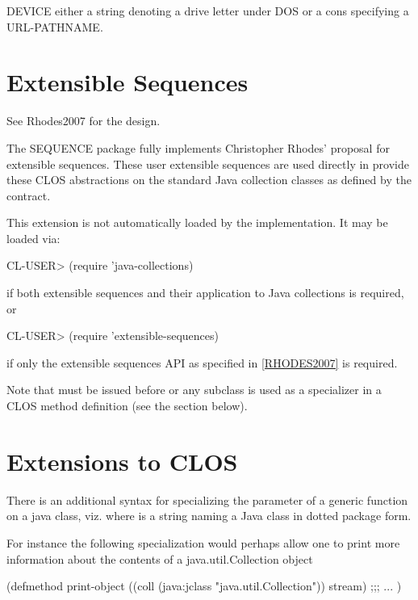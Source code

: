 \documentclass[10pt]{book}
\begin{document}
\textsc{DEVICE} either a string denoting a drive letter under DOS or a cons
specifying a \textsc{URL-PATHNAME}.
         
\section{Extensible Sequences}

See Rhodes2007 \cite{RHODES2007} for the design.

The SEQUENCE package fully implements Christopher Rhodes' proposal for
extensible sequences.  These user extensible sequences are used
directly in  provide these CLOS
abstractions on the standard Java collection classes as defined by the
 contract.

This extension is not automatically loaded by the implementation.   It
may be loaded via:

\begin{listing-lisp}
CL-USER> (require 'java-collections)
\end{listing-lisp}

if both extensible sequences and their application to Java collections
is required, or

\begin{listing-lisp}
CL-USER> (require 'extensible-sequences)
\end{listing-lisp}

if only the extensible sequences API as specified in \ref{RHODES2007} is
required.

Note that  must be issued before
 or any subclass is used as a specializer in a CLOS
method definition (see the section below).

\section{Extensions to CLOS}

There is an additional syntax for specializing the parameter of a
generic function on a java class, viz. 
where  is a string naming a Java class in dotted package
form.

For instance the following specialization would perhaps allow one to
print more information about the contents of a java.util.Collection
object

\begin{listing-lisp}
(defmethod print-object ((coll (java:jclass "java.util.Collection"))
                         stream)
  ;;; ...
)
\end{listing-lisp}
\end{document}
